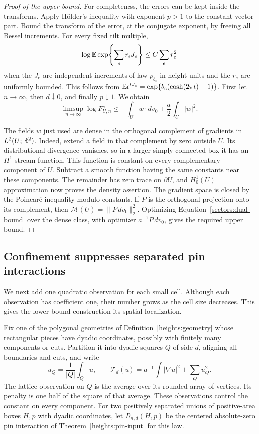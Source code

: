 \begin{proof}[Proof of the upper bound]
For completeness, the errors can be kept inside the transforms.
Apply H\"older's inequality with exponent \(p>1\) to the constant-vector
part. Bound the transform of the error, at the conjugate exponent,
by freeing all Bessel increments. For every fixed tilt multiple,
\[
 \log\mathbb E\exp\!\left\{\sum_e r_e J_e\right\}
 \le C\sum_e r_e^2
\]
when the \(J_e\) are independent increments of law \(p_{b_c}\) in
height units and the \(r_e\) are uniformly bounded.
This follows from
\(\mathbb E e^{tJ_e}=\exp\{b_c(\cosh(2\pi t)-1)\}\).
First let \(n\to\infty\), then \(d\downarrow0\), and finally
\(p\downarrow1\). We obtain
\begin{equation}
 \limsup_{n\to\infty}\log F_{U,n}^s
 \le -\int_Uw\cdot dv_0+\frac a2\int_U|w|^2.
 \label{sectors:dual-bound}
\end{equation}

The fields \(w\) just used are dense in the orthogonal complement of
gradients in \(L^2(U;\mathbb R^2)\). Indeed, extend a field in that complement
by zero outside \(U\). Its distributional divergence vanishes, so in
a larger simply connected box it has an \(H^1\) stream function.
This function is constant on every complementary component of \(U\).
Subtract a smooth function having the same constants near these
components. The remainder has zero trace on \(\partial U\), and
\(H^1_0(U)\) approximation now proves the density assertion.
The gradient space is closed by the Poincar\'e inequality modulo
constants. If \(P\) is the orthogonal projection onto its complement,
then \(\mathcal M(U)=\|P\,dv_0\|_2^2\).
Optimizing Equation~\eqref{sectors:dual-bound} over the dense class,
with optimizer \(a^{-1}P\,dv_0\), gives the required upper bound.
\end{proof}

\subsection{Confinement suppresses separated pin interactions}

We next add one quadratic observation for each small cell. Although
each observation has coefficient one, their number grows as the cell
size decreases. This gives the lower-bound construction its spatial
localization.

Fix one of the polygonal geometries of
Definition~\ref{heights:geometry} whose rectangular pieces have
dyadic coordinates, possibly with finitely many components or cuts.
Partition it into dyadic squares \(Q\) of side
\(d\), aligning all boundaries and cuts, and write
\[
 u_Q=\frac1{|Q|}\int_Q u,\qquad
 \mathcal T_d(u)=a^{-1}\int|\nabla u|^2+\sum_Q u_Q^2 .
\]
The lattice observation on \(Q\) is the average over its rounded array
of vertices. Its penalty is one half of the square of that average.
These observations control the constant on every component.
For two positively separated unions of positive-area boxes \(H,p\)
with dyadic coordinates,
let \(D_{n,d}(H,p)\) be the centered absolute-zero pin interaction of
Theorem~\ref{heights:pin-input} for this law.

